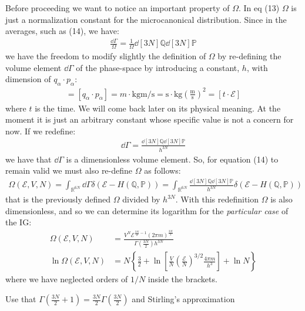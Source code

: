 \documentclass[../template.tex]{subfiles}
\begin{document}
Before proceeding we want to notice an important property of $\Omega$. In eq (13) $\Omega$ is just a normalization constant for the microcanonical distribution. Since in the averages, such as (14), we have:
\begin{align*}
    \frac{\dd{\Gamma}}{\Omega} = \frac{1}{\Omega} \dd[3N]{\mathbb{Q}} \dd[3N]{\mathbb{P}} 
\end{align*}
we have the freedom to modify slightly the definition of $\Omega$ by re-defining the volume element $\dd{\Gamma}$ of the phase-space by introducing a constant, $h$, with dimension of $q_\alpha \cdot p_\alpha$:
\begin{align*}
    [h] = [q_\alpha \cdot p_{\alpha}] = \si{m}\cdot  \si{\kilo\g \m \per \s} = \si{\s} \cdot \si{\kilo\g} \left(\frac{\si{\m}}{\si{\s}} \right)^2 = [t \cdot \mathcal{E}]
\end{align*}
where $t$ is the time. We will come back later on its physical meaning. At the moment it is just an arbitrary constant whose specific value is not a concern for now. If we redefine:
\begin{align*}
    \dd{\Gamma} = \frac{\dd[3N]{\mathbb{Q}}\dd[3N]{\mathbb{P}}}{h^{3N}} 
\end{align*}
we have that $\dd{\Gamma}$ is a dimensionless volume element. So, for equation (14) to remain valid we must also re-define $\Omega$ as follows:
\begin{align}\label{eqn:omega-redef}
    \Omega(\mathcal{E}, V, N) = \int_{\mathbb{R}^{6N}} \dd{\Gamma} \delta\left(\mathcal{E}- H (\mathbb{Q},\mathbb{P})\right) = \int_{\mathbb{R}^{6N}} \frac{\dd[3N]{\mathbb{Q}} \dd[3N]{\mathbb{P}}}{h^{3N}}  \delta(\mathcal{E}- H(\mathbb{Q},\mathbb{P}))
\end{align}
that is the previously defined $\Omega$ divided by $h^{3N}$. With this redefinition $\Omega$ is also dimensionless, and so we can determine its logarithm for the \textit{particular case} of the IG:
\begin{align} \nonumber
    \Omega(\mathcal{E}, V, N) &= \frac{V^N \mathcal{E}^{\frac{3N}{2} - 1 } (2 \pi m)^{\frac{3N}{2} }}{\Gamma\left(\frac{3N}{2} \right) h^{3N}}\\
\ln \Omega (\mathcal{E}, V, N) &= N\left\{ \frac{3}{2} + \ln\left[\frac{V}{N} \left(\frac{\mathcal{E}}{N} \right)^{3/2} \frac{4 \pi m}{h^3}  \right] + \ln N  \right\} \label{eqn:lnOmega}
\end{align} 
where we have neglected orders of $1/N$ inside the brackets. 

\begin{appr}
    Use that $\Gamma\left(\frac{3N}{2}+1 \right) = \frac{3N}{2} \Gamma\left(\frac{3N}{2} \right)$ and Stirling's approximation
\end{appr}
\end{document}
